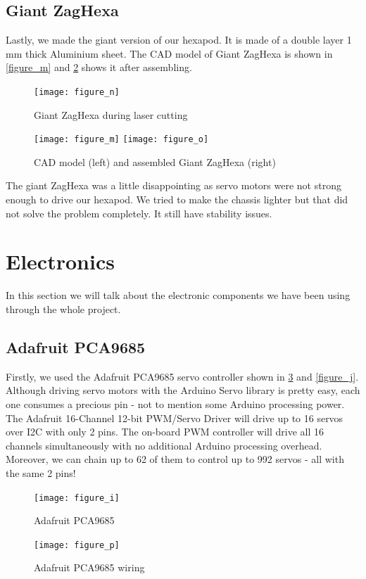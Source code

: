 \subsection{Giant ZagHexa}
Lastly, we made the giant version of our hexapod. It is made of a double layer 1 mm thick Aluminium sheet. The CAD model of Giant ZagHexa is shown in \ref{figure_m} and \ref{figure_o} shows it after assembling.
\begin{figure}[H]
	\centering
	\texttt{[image: figure\_n]}
	\caption{Giant ZagHexa during laser cutting}
	\label{figure_n}
\end{figure}
\begin{figure}[H]
	\centering
    	\texttt{[image: figure\_m]}
	\texttt{[image: figure\_o]}
	\caption{CAD model (left) and assembled Giant ZagHexa (right)}
	\label{figure_o}
\end{figure}


The giant ZagHexa was a little disappointing as servo motors were not strong enough to drive our hexapod. We tried to make the chassis lighter but that did not solve the problem completely. It still have stability issues.

\section{Electronics}
In this section we will talk about the electronic components we have been using through the whole project.
\subsection{Adafruit PCA9685}
Firstly, we used the Adafruit PCA9685 servo controller shown in \ref{figure_i} and \ref{figure_j}. Although driving servo motors with the Arduino Servo library is pretty easy, each one consumes a precious pin - not to mention some Arduino processing power.  The Adafruit 16-Channel 12-bit PWM/Servo Driver will drive up to 16 servos over I2C with only 2 pins.  The on-board PWM controller will drive all 16 channels simultaneously with no additional Arduino processing overhead.  Moreover, we can chain up to 62 of them to control up to 992 servos - all with the same 2 pins!
\begin{figure}[H]
	\centering
	\texttt{[image: figure\_i]}
	\caption{Adafruit PCA9685}
	\label{figure_i}
\end{figure}
\begin{figure}[H]
	\centering
	\texttt{[image: figure\_p]}
	\caption{Adafruit PCA9685 wiring}
	\label{figure_p}
\end{figure}
